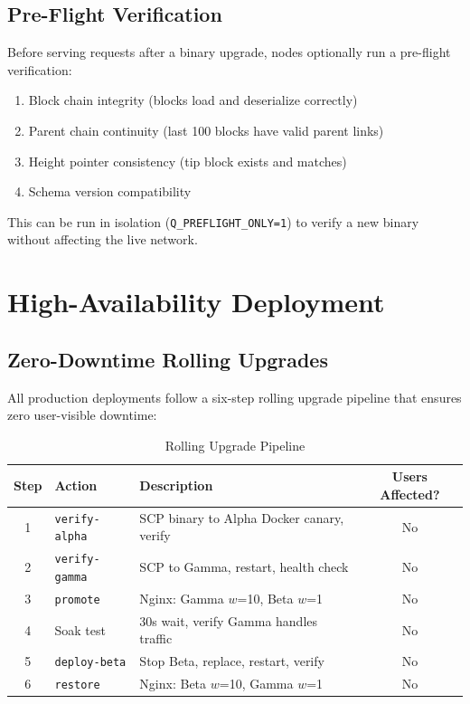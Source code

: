 \documentclass[11pt,a4paper]{article}
\begin{document}
\subsection{Pre-Flight Verification}

Before serving requests after a binary upgrade, nodes optionally run a pre-flight verification:

\begin{enumerate}
    \item Block chain integrity (blocks load and deserialize correctly)
    \item Parent chain continuity (last 100 blocks have valid parent links)
    \item Height pointer consistency (tip block exists and matches)
    \item Schema version compatibility
\end{enumerate}

This can be run in isolation (\texttt{Q\_PREFLIGHT\_ONLY=1}) to verify a new binary without affecting the live network.

\section{High-Availability Deployment}

\subsection{Zero-Downtime Rolling Upgrades}

All production deployments follow a six-step rolling upgrade pipeline that ensures zero user-visible downtime:

\begin{table}[H]
\centering
\begin{tabular}{clp{5.5cm}c}
\toprule
\textbf{Step} & \textbf{Action} & \textbf{Description} & \textbf{Users Affected?} \\
\midrule
1 & \texttt{verify-alpha} & SCP binary to Alpha Docker canary, verify & No \\
2 & \texttt{verify-gamma} & SCP to Gamma, restart, health check & No \\
3 & \texttt{promote} & Nginx: Gamma $w$=10, Beta $w$=1 & No \\
4 & Soak test & 30s wait, verify Gamma handles traffic & No \\
5 & \texttt{deploy-beta} & Stop Beta, replace, restart, verify & No \\
6 & \texttt{restore} & Nginx: Beta $w$=10, Gamma $w$=1 & No \\
\bottomrule
\end{tabular}
\caption{Rolling Upgrade Pipeline}
\end{table}
\end{document}
